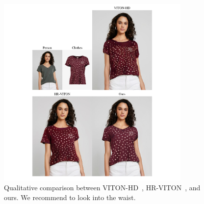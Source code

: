 \begin{figure}[t!]
    \centering
     \includegraphics[width=0.85\textwidth]{fig_supp/fig_suppl_HD_11.pdf}
     \caption{Qualitative comparison between VITON-HD~\cite{choi2021viton}, HR-VITON~\cite{lee2022hrviton}, and ours. We recommend to look into the waist.
     }
     \label{fig_supp_tucked_in_HR_11}
\end{figure}


